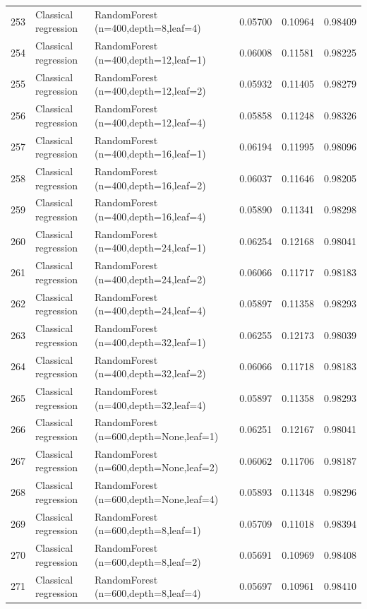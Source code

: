 \documentclass[10pt]{article}
\begin{document}
\begin{longtable}{C{0.75cm}L{2.35cm}L{8.0cm}C{1.15cm}C{1.15cm}C{1.15cm}}
253 & Classical regression & RandomForest (n=400,depth=8,leaf=4) & 0.05700 & 0.10964 & 0.98409 \\
254 & Classical regression & RandomForest (n=400,depth=12,leaf=1) & 0.06008 & 0.11581 & 0.98225 \\
255 & Classical regression & RandomForest (n=400,depth=12,leaf=2) & 0.05932 & 0.11405 & 0.98279 \\
256 & Classical regression & RandomForest (n=400,depth=12,leaf=4) & 0.05858 & 0.11248 & 0.98326 \\
257 & Classical regression & RandomForest (n=400,depth=16,leaf=1) & 0.06194 & 0.11995 & 0.98096 \\
258 & Classical regression & RandomForest (n=400,depth=16,leaf=2) & 0.06037 & 0.11646 & 0.98205 \\
259 & Classical regression & RandomForest (n=400,depth=16,leaf=4) & 0.05890 & 0.11341 & 0.98298 \\
260 & Classical regression & RandomForest (n=400,depth=24,leaf=1) & 0.06254 & 0.12168 & 0.98041 \\
261 & Classical regression & RandomForest (n=400,depth=24,leaf=2) & 0.06066 & 0.11717 & 0.98183 \\
262 & Classical regression & RandomForest (n=400,depth=24,leaf=4) & 0.05897 & 0.11358 & 0.98293 \\
263 & Classical regression & RandomForest (n=400,depth=32,leaf=1) & 0.06255 & 0.12173 & 0.98039 \\
264 & Classical regression & RandomForest (n=400,depth=32,leaf=2) & 0.06066 & 0.11718 & 0.98183 \\
265 & Classical regression & RandomForest (n=400,depth=32,leaf=4) & 0.05897 & 0.11358 & 0.98293 \\
266 & Classical regression & RandomForest (n=600,depth=None,leaf=1) & 0.06251 & 0.12167 & 0.98041 \\
267 & Classical regression & RandomForest (n=600,depth=None,leaf=2) & 0.06062 & 0.11706 & 0.98187 \\
268 & Classical regression & RandomForest (n=600,depth=None,leaf=4) & 0.05893 & 0.11348 & 0.98296 \\
269 & Classical regression & RandomForest (n=600,depth=8,leaf=1) & 0.05709 & 0.11018 & 0.98394 \\
270 & Classical regression & RandomForest (n=600,depth=8,leaf=2) & 0.05691 & 0.10969 & 0.98408 \\
271 & Classical regression & RandomForest (n=600,depth=8,leaf=4) & 0.05697 & 0.10961 & 0.98410 \\

\end{longtable}
\end{document}
